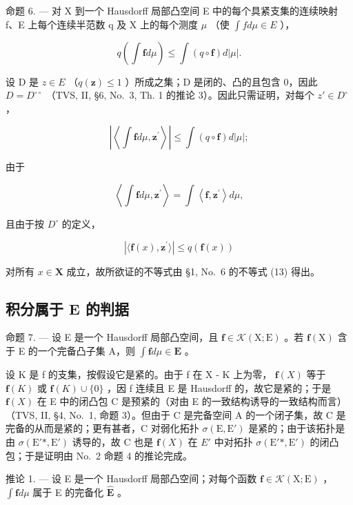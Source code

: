 命题 6. --- 对 X 到一个 Hausdorff 局部凸空间 E 中的每个具紧支集的连续映射 f、E 上每个连续半范数 q 及 X 上的每个测度 \(\mu\) （使 \(\int f d\mu \in E\) ），

\[
q \left(\int \mathbf {f} d \mu\right) \leqslant \int (q \circ \mathbf {f}) d | \mu |.\tag{4}
\]

设 D 是 \(z \in E\) （\(q(\mathbf{z}) \leqslant 1\) ）所成之集；D 是闭的、凸的且包含 0，因此 \(D = D^{\circ\circ}\) （TVS, II, §6, No.~3, Th. 1 的推论 3）。因此只需证明，对每个 \(z' \in D^{\circ}\) ，

\[
\left| \left\langle \int \mathbf {f} d \mu , \mathbf {z} ^ {\prime} \right\rangle \right| \leqslant \int (q \circ \mathbf {f}) d | \mu |;
\]

由于

\[
\left\langle \int \mathbf {f} d \mu , \mathbf {z} ^ {\prime} \right\rangle = \int \left\langle \mathbf {f}, \mathbf {z} ^ {\prime} \right\rangle d \mu ,
\]

且由于按 \(D^{\circ}\) 的定义，

\[
| \langle \mathbf {f} (x), \mathbf {z} ^ {\prime} \rangle | \leqslant q (\mathbf {f} (x))
\]

对所有 \(x \in \mathbf{X}\) 成立，故所欲证的不等式由 §1, No.~6 的不等式 (13) 得出。

\subsection{积分属于 E 的判据}

命题 7. --- 设 E 是一个 Hausdorff 局部凸空间，且 \(\mathbf{f} \in \mathcal{K}(\mathrm{X};\mathrm{E})\) 。若 \(\mathbf{f}(\mathrm{X})\) 含于 E 的一个完备凸子集 A，则 \(\int \mathbf{f} d\mu \in \mathbf{E}\) 。

设 K 是 f 的支集，按假设它是紧的。由于 f 在 X - K 上为零， \(\mathbf{f}(X)\) 等于 \(\mathbf{f}(K)\) 或 \(\mathbf{f}(K) \cup \{0\}\) ，因 f 连续且 E 是 Hausdorff 的，故它是紧的；于是 \(\mathbf{f}(X)\) 在 E 中的闭凸包 C 是预紧的（对由 E 的一致结构诱导的一致结构而言）（TVS, II, §4, No.~1, 命题 3）。但由于 C 是完备空间 A 的一个闭子集，故 C 是完备的从而是紧的；更有甚者，C 对弱化拓扑 \(\sigma(\mathrm{E}, \mathrm{E}')\) 是紧的；由于该拓扑是由 \(\sigma(\mathrm{E}'*, \mathrm{E}')\) 诱导的，故 C 也是 \(\mathbf{f}(X)\) 在 \(E'\) 中对拓扑 \(\sigma(\mathrm{E}'*, \mathrm{E}')\) 的闭凸包；于是证明由 No.~2 命题 4 的推论完成。

推论 1. --- 设 E 是一个 Hausdorff 局部凸空间；对每个函数 \(\mathbf{f} \in \mathcal{K}(\mathrm{X};\mathrm{E})\) ， \(\int \mathbf{f} d\mu\) 属于 E 的完备化 \(\widehat{\mathbf{E}}\) 。


